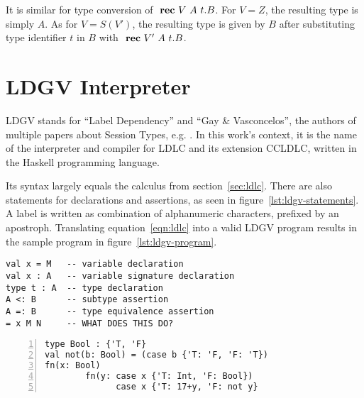 It is similar for type conversion of $\text{ \textbf{rec} } V~A~t.B$. For $V=Z$, the resulting type is simply $A$. As for $V=S(V')$, the resulting type is given by $B$ after substituting type identifier $t$ in $B$ with $\text{ \textbf{rec} } V'~A~t.B$.

\section{LDGV Interpreter}

LDGV stands for ``Label Dependency'' and ``Gay \& Vasconcelos'', the authors of multiple papers about Session Types, e.g. \cite{gayvasconcelos2010}. In this work's context, it is the name of the interpreter and compiler for LDLC and its extension CCLDLC, written in the Haskell programming language.

Its syntax largely equals the calculus from section~\ref{sec:ldlc}. There are also statements for declarations and assertions, as seen in figure~\ref{lst:ldgv-statements}.
A label is written as combination of alphanumeric characters, prefixed by an apostroph. Translating equation~\ref{eqn:ldlc} into a valid LDGV program results in the sample program in figure~\ref{lst:ldgv-program}.

\begin{lstlisting}[language=ldgv,caption=Statements in LDGV,label=lst:ldgv-statements]
val x = M   -- variable declaration
val x : A   -- variable signature declaration
type t : A  -- type declaration
A <: B      -- subtype assertion
A =: B      -- type equivalence assertion
= x M N     -- WHAT DOES THIS DO?
\end{lstlisting}

\begin{lstlisting}[language=ldgv,numbers=left,caption=Sample LDGV program,label=lst:ldgv-program]
type Bool : {'T, 'F}
val not(b: Bool) = (case b {'T: 'F, 'F: 'T})
fn(x: Bool)
        fn(y: case x {'T: Int, 'F: Bool})
              case x {'T: 17+y, 'F: not y}
\end{lstlisting}

